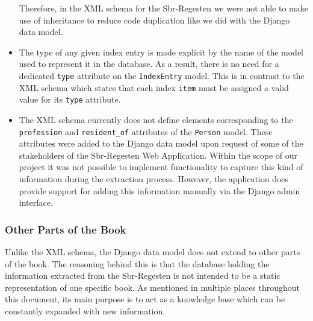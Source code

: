 \begin{itemize}
  Therefore, in the XML schema for the Sbr-Regesten we were not able
  to make use of inheritance to reduce code duplication like we did
  with the Django data model.
\item The type of any given index entry is made explicit by the name
  of the model used to represent it in the database. As a result,
  there is no need for a dedicated \texttt{type} attribute on the
  \texttt{IndexEntry} model. This is in contrast to the XML schema
  which states that each index \texttt{item} must be assigned a valid
  value for its \texttt{type} attribute.
\item The XML schema currently does not define elements corresponding
  to the \texttt{profession} and \texttt{resident\_of} attributes of
  the \texttt{Person} model. These attributes were added to the Django
  data model upon request of some of the stakeholders of the
  Sbr-Regesten Web Application. Within the scope of our project it was
  not possible to implement functionality to capture this kind of
  information during the extraction process. However, the application
  does provide support for adding this information manually via the
  Django admin interface.
\end{itemize}

\subsubsection{Other Parts of the Book}
\label{sec:other-model}

Unlike the XML schema, the Django data model does not extend to other
parts of the book. The reasoning behind this is that the database
holding the information extracted from the Sbr-Regesten is not
intended to be a static representation of one specific book. As
mentioned in multiple places throughout this document, its main
purpose is to act as a knowledge base which can be constantly expanded
with new information.
